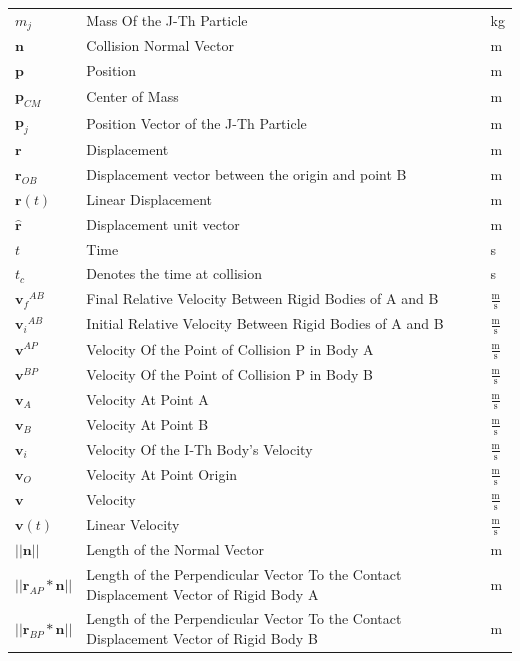\documentclass[12pt]{article}
\begin{document}
\begin{longtabu}{l X[l] l}
\\
${m_{j}}$ & Mass Of the J-Th Particle & kg
\\
$\mathbf{n}$ & Collision Normal Vector & m
\\
$\mathbf{p}$ & Position & m
\\
${\mathbf{p}_{CM}}$ & Center of Mass & m
\\
${\mathbf{p}_{j}}$ & Position Vector of the J-Th Particle & m
\\
$\mathbf{r}$ & Displacement & m
\\
${\mathbf{r}_{OB}}$ & Displacement vector between the origin and point B & m
\\
$\mathbf{r}(t)$ & Linear Displacement & m
\\
$\mathbf{\hat{r}}$ & Displacement unit vector & m
\\
$t$ & Time & s
\\
${t_{c}}$ & Denotes the time at collision & s
\\
${{\mathbf{v}_{f}}^{AB}}$ & Final Relative Velocity Between Rigid Bodies of A and B & $\frac{\text{m}}{\text{s}}$
\\
${{\mathbf{v}_{i}}^{AB}}$ & Initial Relative Velocity Between Rigid Bodies of A and B & $\frac{\text{m}}{\text{s}}$
\\
${\mathbf{v}^{AP}}$ & Velocity Of the Point of Collision P in Body A & $\frac{\text{m}}{\text{s}}$
\\
${\mathbf{v}^{BP}}$ & Velocity Of the Point of Collision P in Body B & $\frac{\text{m}}{\text{s}}$
\\
${\mathbf{v}_{A}}$ & Velocity At Point A & $\frac{\text{m}}{\text{s}}$
\\
${\mathbf{v}_{B}}$ & Velocity At Point B & $\frac{\text{m}}{\text{s}}$
\\
${\mathbf{v}_{i}}$ & Velocity Of the I-Th Body's Velocity & $\frac{\text{m}}{\text{s}}$
\\
${\mathbf{v}_{O}}$ & Velocity At Point Origin & $\frac{\text{m}}{\text{s}}$
\\
$\mathbf{v}$ & Velocity & $\frac{\text{m}}{\text{s}}$
\\
$\mathbf{v}(t)$ & Linear Velocity & $\frac{\text{m}}{\text{s}}$
\\
$||\mathbf{n}||$ & Length of the Normal Vector & m
\\
$||{\mathbf{r}_{AP}}*\mathbf{n}||$ & Length of the Perpendicular Vector To the Contact Displacement Vector of Rigid Body A & m
\\
$||{\mathbf{r}_{BP}}*\mathbf{n}||$ & Length of the Perpendicular Vector To the Contact Displacement Vector of Rigid Body B & m

\end{longtabu}
\end{document}
